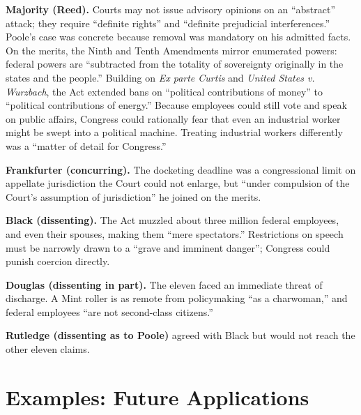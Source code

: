 \documentclass[12pt]{article}
\begin{document}
\textbf{Majority (Reed).} Courts may not issue advisory opinions on an ``abstract'' attack; they require ``definite rights'' and ``definite prejudicial interferences.'' Poole's case was concrete because removal was mandatory on his admitted facts. On the merits, the Ninth and Tenth Amendments mirror enumerated powers: federal powers are ``subtracted from the totality of sovereignty originally in the states and the people.'' Building on \textit{Ex parte Curtis} and \textit{United States v. Wurzbach}, the Act extended bans on ``political contributions of money'' to ``political contributions of energy.'' Because employees could still vote and speak on public affairs, Congress could rationally fear that even an industrial worker might be swept into a political machine. Treating industrial workers differently was a ``matter of detail for Congress.''

\textbf{Frankfurter (concurring).} The docketing deadline was a congressional limit on appellate jurisdiction the Court could not enlarge, but ``under compulsion of the Court's assumption of jurisdiction'' he joined on the merits.

\textbf{Black (dissenting).} The Act muzzled about three million federal employees, and even their spouses, making them ``mere spectators.'' Restrictions on speech must be narrowly drawn to a ``grave and imminent danger''; Congress could punish coercion directly.

\textbf{Douglas (dissenting in part).} The eleven faced an immediate threat of discharge. A Mint roller is as remote from policymaking ``as a charwoman,'' and federal employees ``are not second-class citizens.''

\textbf{Rutledge (dissenting as to Poole)} agreed with Black but would not reach the other eleven claims.

\section{Examples: Future Applications}
\end{document}

